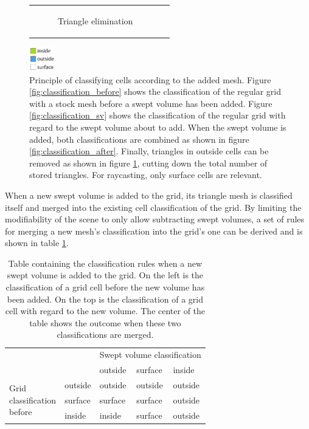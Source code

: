 \begin{figure}[!h]
\begin{tabular}{cc}
\begin{subfigure}[t]{0.3\textwidth}
			\caption{Triangle elimination}
			\label{fig:classification_after_removal}
		\end{subfigure}\\
	\end{tabular}
	\includegraphics[width=0.1\textwidth]{images/classification_legend}
	\caption{
		Principle of classifying cells according to the added mesh.
		Figure \ref{fig:classification_before} shows the classification of the regular grid with a stock mesh before a swept volume has been added.
		Figure \ref{fig:classification_sv} shows the classification of the regular grid with regard to the swept volume about to add.
		When the swept volume is added, both classifications are combined as shown in figure \ref{fig:classification_after}.
		Finally, triangles in outside cells can be removed as shown in figure \ref{fig:classification_after_removal}, cutting down the total number of stored triangles.
		For raycasting, only surface cells are relevant.
		}
	\label{fig:classification}
\end{figure}

When a new swept volume is added to the grid, its triangle mesh is classified itself and merged into the existing cell classification of the grid.
By limiting the modifiability of the scene to only allow subtracting swept volumes, a set of rules for merging a new mesh's classification into the grid's one can be derived and is shown in table \ref{tbl:classification_rules}.

\begin{table}[h]
	\centering
	\begin{tabular}{p{2cm}p{2cm}|p{2cm}p{2cm}p{2cm}}
		&         & \multicolumn{3}{l}{Swept volume classification} \\
		&         & outside           & surface           & inside            \\ \hline
		\multirow{3}{*}{\parbox{2cm}{Grid \\ classification \\ before}} & outside & outside           & outside           & outside           \\
		& surface & surface           & surface           & outside           \\
		& inside  & inside            & surface           & outside          
	\end{tabular}
	\caption{
		Table containing the classification rules when a new swept volume is added to the grid.
		On the left is the classification of a grid cell before the new volume has been added.
		On the top is the classification of a grid cell with regard to the new volume.
		The center of the table shows the outcome when these two classifications are merged.
	}
	\label{tbl:classification_rules}
\end{table}

